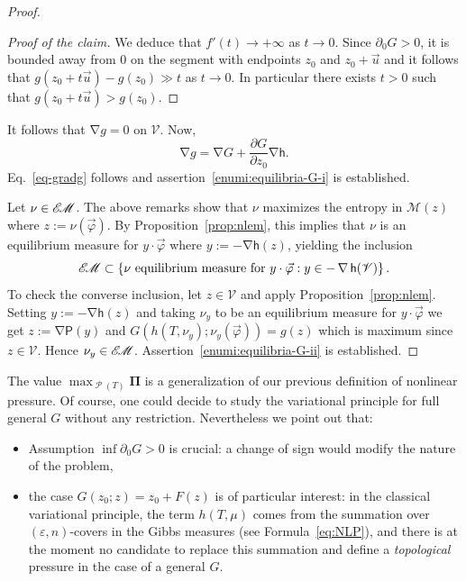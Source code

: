 \documentclass[AHL, Unicode, longabstracts,published]{cedram}
\theoremstyle{plain}
\theoremstyle{plain}
\newcommand\eps{\varepsilon}
\newcommand\FNLP{\boldsymbol{\Pi}}
\newcommand\vpot{\vec\pot}
\newcommand\Prob{{\operatorname{\mathscr{P}}}}
\newcommand{\grad}{\operatorname{\nabla}}
\newcommand{\hf}{\mathsf{h}}
\newcommand{\Pf}{\mathsf{P}}
\newcommand{\EM}{\mathscr{E\kern-2pt M}}
\newcommand{\pot}{\varphi}
\newcounter{In}
\newcommand*\8{\infty}
\newcommand{\cM}{\mathcal{M}}
\newcommand{\scV}{\mathscr{V}}
\begin{document}
\begin{proof}
\begin{proof}[Proof of the claim]
We deduce that $f'(t)\to+\infty$ as $t\to0$. Since $\partial_0G>0$, it is bounded away from $0$ on the segment with endpoints $z_0$ and $z_0+\vec u$ and it follows that $g(z_0+t \vec u)-g(z_0)\gg t$ as $t\to0$. In particular there exists $t>0$ such that $g(z_0+t \vec u)>g(z_0)$.
\end{proof}


It follows that $\grad g = 0$ on $\scV$. Now,
\begin{equation}\label{eq-grad-g}
\grad g = \grad G + \frac{\partial G}{\partial z_0} \grad \hf.
\end{equation}
Eq.~\eqref{eq-gradg} follows and assertion~\eqref{enumi:equilibria-G-i} is established.

Let $\nu\in\EM$. The above remarks show that $\nu$ maximizes the entropy in $\cM(z)$ where $ z:=\nu(\vpot)$. By Proposition~\ref{prop:nlem}, this implies that $\nu$ is an equilibrium measure for $y\cdot\vpot$ where $ y:=-\grad\hf(z)$, yielding the inclusion
\[
\EM \subset \left\{ \nu \text{ equilibrium measure for }y\cdot\vpot : y\in -\grad\hf(\scV)\right\}.
\]
To check the converse inclusion, let $ z\in\scV$ and apply Proposition~\ref{prop:nlem}. Setting $y:=-\grad\hf(z)$ and taking $\nu_y$ to be an equilibrium measure for $y\cdot\vpot$ we get $ z:=\grad\Pf(y)$ and $G(h(T,\nu_{ y});\nu_{ y}(\vpot))=g(z)$ which is maximum since $ z\in\scV$. Hence $\nu_{ y}\in\EM$. Assertion~\eqref{enumi:equilibria-G-ii} is established.
\end{proof}


\begin{rema}
The value $\max_{\Prob(T)} \FNLP$ is a generalization of our previous definition of nonlinear pressure. Of course, one could decide to study the variational principle for full general $G$ without any restriction. Nevertheless we point out that:
\begin{itemize}
\item[\eqref{enumi:equilibria-G-i}] Assumption $\inf\partial_0 G>0$ is crucial: a change of sign would modify the nature of the problem,
\item[\eqref{enumi:equilibria-G-ii}] the case $G(z_0; z) = z_0+F(z)$ is of particular interest: in the classical variational principle, the term $h(T,\mu)$ comes from the summation over $(\eps,n)$-covers in the Gibbs measures (see Formula~\eqref{eq:NLP}), and there is at the moment no candidate to replace this summation and define a \emph{topological} pressure in the case of a general $G$.
\end{itemize}
\end{rema}
\end{document}
